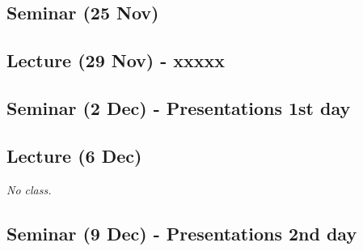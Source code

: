 \documentclass[12pt, a4paper]{article}
\begin{document}
\subsection*{Seminar (25 Nov)}

\subsection*{Lecture (29 Nov) - xxxxx}

\subsection*{Seminar (2 Dec) - Presentations 1st day}

\subsection*{Lecture (6 Dec) {\color{red}{(No class)}}}

\textit{No class.}

\subsection*{Seminar (9 Dec) - Presentations 2nd day}
\end{document}
